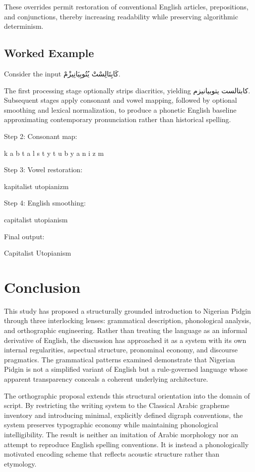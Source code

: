 \documentclass[12pt]{article}
\newcommand{\AR}[1]{\foreignlanguage{arabic}{#1}}
\begin{document}
These overrides permit restoration of conventional English articles, prepositions, and conjunctions, thereby increasing readability while preserving algorithmic determinism.

\subsection{Worked Example}

Consider the input \AR{كَابِتَالِسْتْ يُتُوبِيَانِيزْمْ}. 

The first processing stage optionally strips diacritics, yielding \AR{كابتالست يتوبيانيزم}. Subsequent stages apply consonant and vowel mapping, followed by optional smoothing and lexical normalization, to produce a phonetic English baseline approximating contemporary pronunciation rather than historical spelling.

Step 2: Consonant map:

k a b t a l s t y t u b y a n i z m

Step 3: Vowel restoration:

kapitalist utopianizm

Step 4: English smoothing:

capitalist utopianism

Final output:

Capitalist Utopianism

\section*{Conclusion}

This study has proposed a structurally grounded introduction to Nigerian Pidgin through three interlocking lenses: grammatical description, phonological analysis, and orthographic engineering. Rather than treating the language as an informal derivative of English, the discussion has approached it as a system with its own internal regularities, aspectual structure, pronominal economy, and discourse pragmatics. The grammatical patterns examined demonstrate that Nigerian Pidgin is not a simplified variant of English but a rule-governed language whose apparent transparency conceals a coherent underlying architecture.

The orthographic proposal extends this structural orientation into the domain of script. By restricting the writing system to the Classical Arabic grapheme inventory and introducing minimal, explicitly defined digraph conventions, the system preserves typographic economy while maintaining phonological intelligibility. The result is neither an imitation of Arabic morphology nor an attempt to reproduce English spelling conventions. It is instead a phonologically motivated encoding scheme that reflects acoustic structure rather than etymology.
\end{document}
